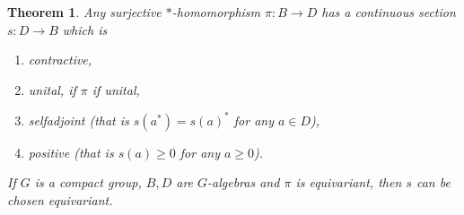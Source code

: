 \documentclass{article}%
\newtheorem{theorem}{Theorem}
\begin{document}
\begin{theorem}\label{section} Any surjective $\ast$-homomorphism $\pi: B \to D$ has a continuous section $s: D \to B$ which is
\begin{enumerate}

\item  contractive,

\item  unital, if $\pi$ if unital,

\item selfadjoint (that is $s(a^*) = s(a)^*$ for any $a\in D$),

\item positive (that is $s(a)\ge 0$ for any $a\ge 0$).
\end{enumerate}

\noindent If $G$ is  a compact group, $B, D$ are $G$-algebras and $\pi$ is equivariant, then $s$  can be chosen equivariant.
\end{theorem}
\end{document}
